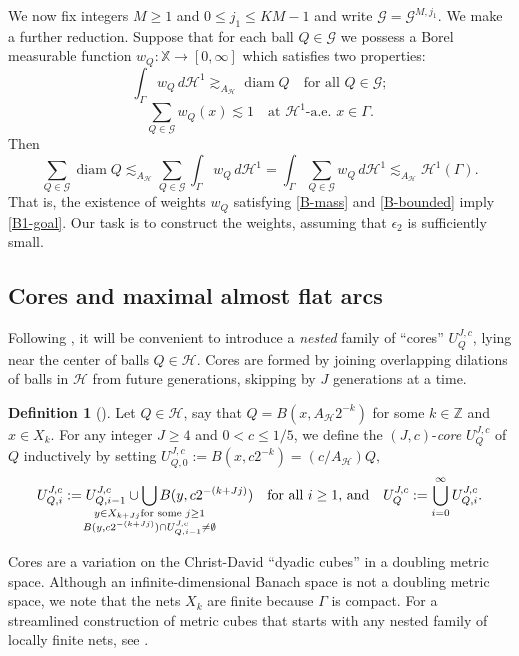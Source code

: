 \documentclass[12pt]{amsart}
\numberwithin{equation}{section}
\theoremstyle{plain}
\theoremstyle{definition}
\newtheorem{definition}[theorem]{Definition}
\def\ZZ{\mathbb{Z}}
\def\XX{{\mathbb{X}}}
\newcommand{\diam}{\mathop\mathrm{diam}\nolimits}
\newcommand{\Haus}{\mathcal{H}}
\newcommand{\flatepsilon}{\epsilon_2}
\numberwithin{figure}{section}
\begin{document}
We now fix integers $M\geq 1$ and $0\leq j_1\leq KM-1$ and write $\mathscr{G}=\mathscr{G}^{M,j_1}$. We make a further reduction. Suppose that for each ball $Q\in\mathscr{G}$ we possess a Borel measurable function $w_Q:\XX\rightarrow[0,\infty]$ which satisfies two properties: \begin{equation} \label{B-mass}
\int_\Gamma w_Q\,d\Haus^1\gtrsim_{A_\mathscr{H}} \diam Q\quad\text{for all }Q\in\mathscr{G};\end{equation}
\begin{equation}\label{B-bounded} \sum_{Q\in\mathscr{G}} w_Q(x)\lesssim 1\quad\text{at $\Haus^1$-a.e. }x\in\Gamma.\end{equation} Then $$\sum_{Q\in\mathscr{G}} \diam Q \lesssim_{A_\mathscr{H}} \sum_{Q\in\mathscr{G}} \int_\Gamma w_Q\,d\Haus^1
= \int_\Gamma \sum_{Q\in\mathscr{G}} w_Q\,d\Haus^1 \lesssim_{A_\mathscr{H}} \Haus^1(\Gamma).$$ That is, the existence of weights $w_Q$ satisfying \eqref{B-mass} and \eqref{B-bounded} imply \eqref{B1-goal}. Our task is to construct the weights, assuming that $\flatepsilon$ is sufficiently small.

\subsection{Cores and maximal almost flat arcs}\label{ss:cores-def}

Following \cite{Schul-Hilbert}, it will be convenient to introduce a \emph{nested} family of ``cores'' $U_{Q}^{J,c}$, lying near the center of balls $Q\in \mathscr{H}$. Cores are formed by joining overlapping dilations of balls in $\mathscr{H}$ from future generations, skipping by $J$ generations at a time.

\begin{definition}[{\cite{Schul-Hilbert}}] \label{def-general-cores} Let $Q\in\mathscr{H}$, say that $Q=B(x,A_\mathscr{H}2^{-k})$ for some $k\in\ZZ$ and $x\in X_k$. For any integer $J\geq 4$ and $0<c\leq 1/5$, we define the $(J,c)$-\emph{core} $U^{J,c}_Q$ of $Q$ inductively by setting $U^{J,c}_{Q,0}:= B(x,c2^{-k})=(c/A_\mathscr{H})Q,$
$$U^{J,c}_{Q,i} := U^{J,c}_{Q,i-1}\cup \bigcup_{\mathclap{\substack{y\in X_{k+Jj}\text{for some }j\geq 1\\ B(y,c 2^{-(k+Jj)})\cap U^{J,c}_{Q,i-1}\neq\emptyset}}} B(y,c 2^{-(k+Jj)})\quad\text{for all $i\geq 1$, and\quad} U^{J,c}_Q := \bigcup_{i=0}^\infty U^{J,c}_{Q,i}.$$
\end{definition}

Cores are a variation on the Christ-David ``dyadic cubes'' in a doubling metric space. Although an infinite-dimensional Banach space is not a doubling metric space, we note that the nets $X_k$ are finite because $\Gamma$ is compact. For a streamlined construction of metric cubes that starts with any nested family of locally finite nets, see \cite{KRS-cubes}.
\end{document}
